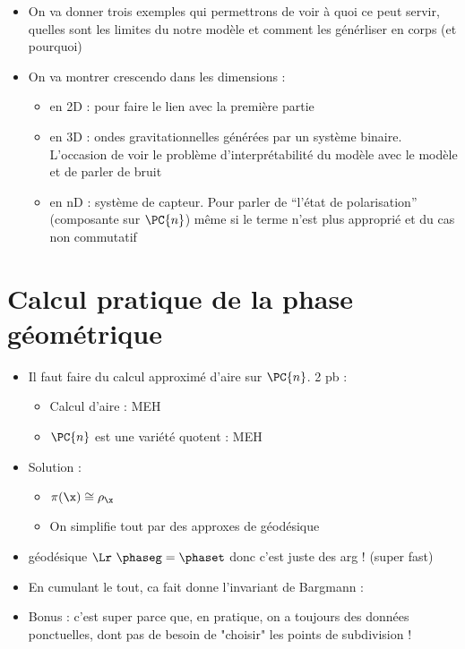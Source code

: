 
\begin{itemize}
	\item On va donner trois exemples qui permettrons de voir à quoi ce peut servir, quelles sont les limites du notre modèle et comment les générliser en corps (et pourquoi)
	
	\item On va montrer crescendo dans les dimensions :\begin{itemize}
		
		\item en 2D  : pour faire le lien avec la première partie
		
		\item en 3D : ondes gravitationnelles générées par un système binaire. L'occasion de voir le problème d'interprétabilité du modèle avec le modèle et de parler de bruit
		
		\item en nD : système de capteur. Pour parler de ``l'état de polarisation'' (composante sur $\PC{n}$) même si le terme n'est plus approprié et du cas non commutatif
	\end{itemize}
\end{itemize}




\section{\todo Calcul pratique de la phase géométrique}

\begin{itemize}
	
	\item Il faut faire du calcul approximé d'aire sur $\PC{n}$. 2 pb : \begin{itemize}
		
		\item Calcul d'aire : MEH
		
		\item  $\PC{n}$ est une variété quotent : MEH
		
	\end{itemize}
	
	\item Solution : \begin{itemize}
		
		\item $\pi(\x) \cong \rho_{\x}$
		
		\item On simplifie tout par des approxes de géodésique
	\end{itemize}
	
	\item géodésique $\Lr\ \phaseg = \phaset$ donc c'est juste des arg ! (super fast)
	
	\item En cumulant le tout, ca fait donne l'invariant de Bargmann :
	
	\item Bonus : c'est super parce que, en pratique, on a toujours des données ponctuelles, dont pas de besoin de "choisir" les points de subdivision !
\end{itemize}




